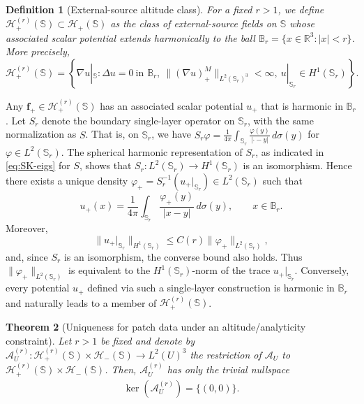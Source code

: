 \documentclass[a4paper, 11pt]{article}
\newtheorem{theorem}{Theorem}
\newtheorem{definition}[theorem]{Definition}
\renewcommand{\SS}{\mathbb{S}}
\newcommand{\BB}{\mathbb{B}}
\newcommand{\f}{\mathbf{f}}
\begin{document}
\begin{definition}[External-source altitude class]\label{def:Hplus_r}
For a fixed \(r>1\), we define \(\mathcal H_+^{(r)}(\SS)\subset \mathcal H_+(\SS)\) as the class of external-source fields on \(\SS\) whose associated scalar potential extends harmonically to the ball \(\BB_r=\{x\in\mathbb R^3:|x|<r\}\). 
More precisely,
\[
    \mathcal H_+^{(r)}(\SS)
    =
    \left\{
    \nabla u|_{\SS}:\Delta u=0\ \text{in }\BB_r,\ \|(\nabla u)_+^M\|_{L^2(\SS_r)^3}<\infty,\ u|_{\SS_r}\in H^1(\SS_r)
    \right\}.
\]
\end{definition}

Any \(\f_+\in\mathcal H_+^{(r)}(\SS)\) has an associated scalar potential \(u_+\) that is harmonic in \(\BB_r\). 
Let \(S_r\) denote the boundary single-layer operator on \(\SS_r\), with the same normalization as \(S\). That is, on $\SS_r$, we have $S_r\varphi=\frac{1}{4\pi}\int_{\SS_r}\frac{\varphi(y)}{|\cdot-y|}\,d\sigma(y)$ for $\varphi\in L^2(\SS_r)$. The spherical harmonic representation of \(S_r\), as indicated in \eqref{eq:SK-eigs} for $S$, shows that \(S_r:L^2(\SS_r)\longrightarrow H^1(\SS_r) \) is an isomorphism. Hence there exists a unique density \(\varphi_+=S_r^{-1}(u_+|_{\SS_r})\in L^2(\SS_r) \) such that \[ u_+(x)=\frac{1}{4\pi}\int_{\SS_r}\frac{\varphi_+(y)}{|x-y|}\,d\sigma(y), \qquad x\in \BB_r . \] Moreover, \[ \|u_+|_{\SS_r}\|_{H^1(\SS_r)} \le C(r)\|\varphi_+\|_{L^2(\SS_r)}, \] and, since \(S_r\) is an isomorphism, the converse bound also holds. Thus \(\|\varphi_+\|_{L^2(\SS_r)}\) is equivalent to the \(H^1(\SS_r)\)-norm of the 
trace \(u_+|_{\SS_r}\). Conversely, every potential $u_+$ defined via such a single-layer construction is harmonic in \(\BB_r\) and naturally leads to a member of \(\mathcal H_+^{(r)}(\SS)\).


\begin{theorem}[Uniqueness for patch data under an altitude/analyticity constraint]\label{thm:unique_r}
Let $r>1$ be fixed and denote by $\mathcal A_U^{(r)}:\mathcal H_+^{(r)}(\SS)\times \mathcal H_-(\SS)\to L^2(U)^3$ the restriction of $\mathcal A_U$ to $\mathcal H_+^{(r)}(\SS)\times \mathcal H_-(\SS)$. Then, $\mathcal A_U^{(r)}$ has only the trivial nullspace
\begin{align}
	\ker(\mathcal A_U^{(r)})=\big\{(0,0)\big\}.\nonumber
\end{align} 
\end{theorem}
\end{document}
